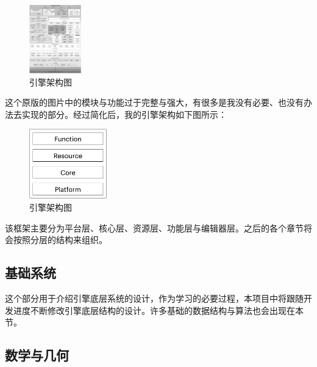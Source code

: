 \begin{figure}[H]
\centering
\includegraphics[center, width=0.20\textwidth]{chapter00/fig-runtime-arch.jpeg}
\caption{引擎架构图 \protect\footnotemark}
\end{figure}

这个原版的图片中的模块与功能过于完整与强大，有很多是我没有必要、也没有办法去实现的部分。经过简化后，我的引擎架构如下图所示：

\begin{figure}[H]
\centering
\includegraphics[center, width=0.30\textwidth]{chapter00/architecture.png}
\caption{引擎架构图 \protect\footnotemark}
\end{figure}

该框架主要分为平台层、核心层、资源层、功能层与编辑器层。之后的各个章节将会按照分层的结构来组织。

\maketitle
\subsection{基础系统}

这个部分用于介绍引擎底层系统的设计，作为学习的必要过程，本项目中将跟随开发进度不断修改引擎底层结构的设计。许多基础的数据结构与算法也会出现在本节。

\maketitle
\subsection{数学与几何}

